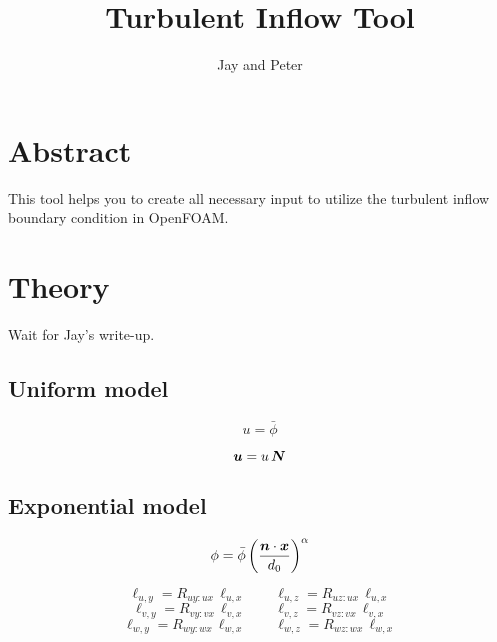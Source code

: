 \documentclass[11pt, oneside]{article}   	%
\title{Turbulent Inflow Tool}
\author{Jay and Peter}
\newcommand{\vectr}[1]{\hbox{\boldmath$#1$}}
\begin{document}
\maketitle

\section{Abstract}

This tool helps you to create all necessary input to utilize the turbulent inflow boundary condition in OpenFOAM.

\section{Theory}

Wait for Jay's write-up.

\subsection{Uniform model}

\begin{equation}
   u = \bar\phi
   \label{Eq1}
\end{equation}

\begin{equation}
   \vectr{u} = u\,\vectr{N}
   \label{Eq2}
\end{equation}

\subsection{Exponential model}

\begin{equation}
   \phi = \bar\phi \left( \frac{\vectr{n} \cdot \vectr{x} }{d_0} \right)^\alpha
   \label{Eq11}
\end{equation}

\begin{equation}
   \ell_{u,y} = R_{uy:ux} \, \ell_{u,x}   \qquad   \ell_{u,z} = R_{uz:ux} \, \ell_{u,x}
   \label{Eq12}
\end{equation}
\begin{equation}
   \ell_{v,y} = R_{vy:vx} \, \ell_{v,x}   \qquad   \ell_{v,z} = R_{vz:vx} \, \ell_{v,x}
   \label{Eq13}
\end{equation}
\begin{equation}
   \ell_{w,y} = R_{wy:wx} \, \ell_{w,x}   \qquad   \ell_{w,z} = R_{wz:wx} \, \ell_{w,x}
   \label{Eq14}
\end{equation}
\end{document}
